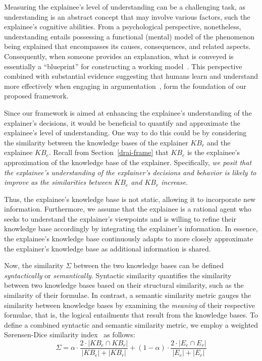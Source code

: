\documentclass{ecai}
\begin{document}
Measuring the explainee's level of understanding can be a challenging task, as understanding is an abstract concept that may involve various factors, such the explainee's cognitive abilities. From a psychological perspective, nonetheless, understanding entails possessing a functional (mental) model of the phenomenon being explained that encompasses its causes, consequences, and related aspects. Consequently, when someone provides an explanation, what is conveyed is essentially a ``blueprint'' for constructing a working model~\cite{johnson1983mental}. This perspective combined with substantial evidence suggesting that humans learn and understand more effectively when engaging in argumentation~\cite{mercier2011humans}, form the foundation of our proposed framework.

Since our framework is aimed at enhancing the explainee's understanding of the explainer's decisions, it would be beneficial to quantify and approximate the explainee's level of understanding. One way to do this could be by considering the similarity between the knowledge bases of the explainer $KB_r$ and the explainee $KB_e$. Recall from Section~\ref{drai-frame} that $KB_e$ is the explainee's approximation of the knowledge base of the explainer. %
Specifically, \emph{we posit that the explainee's understanding of the explainer's decisions and behavior is likely to improve as the similarities between $KB_e$ and $KB_r$ increase}.


Thus, the explainee's knowledge base is not static, allowing it to incorporate new information. Furthermore, we assume that the explainee is a rational agent who seeks to understand the explainer's viewpoints and is willing to refine their knowledge base accordingly by integrating the explainer's information. In essence, the explainee's knowledge base continuously adapts to more closely approximate the explainer's knowledge base as additional information is shared.

Now, the similarity $\Sigma$ between the two knowledge bases can be defined \emph{syntactically} or \emph{semantically}. Syntactic similarity quantifies the similarity between two knowledge bases based on their structural similarity, such as the similarity of their formulae. In contrast, a semantic similarity metric gauges the similarity between knowledge bases by examining the \emph{meaning} of their respective formulae, that is, the logical entailments that result from the knowledge bases.
To define a combined syntactic and semantic similarity metric, we employ a weighted Sørensen-Dice similarity index~\cite{dice1945measures,sorensen1948method} as follows:
\begin{equation}
    \Sigma = \alpha \cdot \frac{2\cdot|KB_e \cap KB_r|}{|KB_e|+|KB_r|} +(1-\alpha)\cdot \frac{2\cdot|E_e \cap E_r|}{|E_e|+|E_r|} 
\end{equation} 
\end{document}
